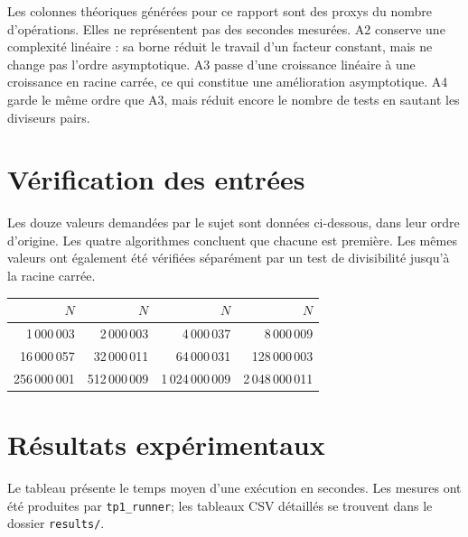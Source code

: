 \documentclass[11pt,a4paper]{article}
\begin{document}
Les colonnes théoriques générées pour ce rapport sont des proxys du nombre d'opérations. Elles ne représentent pas des secondes mesurées. A2 conserve une complexité linéaire : sa borne réduit le travail d'un facteur constant, mais ne change pas l'ordre asymptotique. A3 passe d'une croissance linéaire à une croissance en racine carrée, ce qui constitue une amélioration asymptotique. A4 garde le même ordre que A3, mais réduit encore le nombre de tests en sautant les diviseurs pairs.

\section{Vérification des entrées}

Les douze valeurs demandées par le sujet sont données ci-dessous, dans leur ordre d'origine. Les quatre algorithmes concluent que chacune est première. Les mêmes valeurs ont également été vérifiées séparément par un test de divisibilité jusqu'à la racine carrée.

\begin{center}
\begin{tabular}{rrrr}
\toprule
$N$ & $N$ & $N$ & $N$ \\
\midrule
1\,000\,003 & 2\,000\,003 & 4\,000\,037 & 8\,000\,009 \\
16\,000\,057 & 32\,000\,011 & 64\,000\,031 & 128\,000\,003 \\
256\,000\,001 & 512\,000\,009 & 1\,024\,000\,009 & 2\,048\,000\,011 \\
\bottomrule
\end{tabular}
\end{center}

\section{Résultats expérimentaux}

Le tableau présente le temps moyen d'une exécution en secondes. Les mesures ont été produites par \texttt{tp1\_runner}; les tableaux CSV détaillés se trouvent dans le dossier \texttt{results/}.
\end{document}
